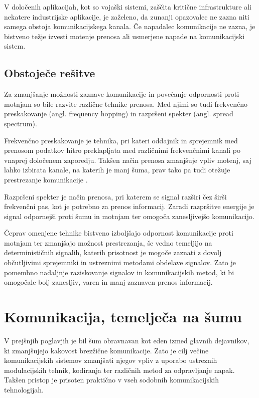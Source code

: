 \documentclass[a4paper, 12pt, openany]{book}
\begin{document}
V določenih aplikacijah, kot so vojaški sistemi, zaščita kritične infrastrukture ali nekatere industrijske aplikacije, je zaželeno, da zunanji opazovalec ne zazna niti samega obstoja komunikacijskega kanala. Če napadalec komunikacije ne zazna, je bistveno težje izvesti motenje prenosa ali usmerjene napade na komunikacijski sistem.

\subsection{Obstoječe rešitve}
Za zmanjšanje možnosti zaznave komunikacije in povečanje odpornosti proti motnjam so bile razvite različne tehnike prenosa. Med njimi so tudi frekvenčno preskakovanje (angl. frequency hopping) in razpršeni spekter (angl. spread spectrum).

Frekvenčno preskakovanje je tehnika, pri kateri oddajnik in sprejemnik med prenosom podatkov hitro preklapljata med različnimi frekvenčnimi kanali po vnaprej določenem zaporedju. Takšen način prenosa zmanjšuje vpliv motenj, saj lahko izbirata kanale, na katerih je manj šuma, prav tako pa tudi otežuje prestrezanje komunikacije \cite{bluetoothAFH}.

Razpršeni spekter je način prenosa, pri katerem se signal razširi čez širši frekvenčni pas, kot je potrebno za prenos informacij. Zaradi razpršitve energije je signal odpornejši proti šumu in motnjam ter omogoča zanesljivejšo komunikacijo.


Čeprav omenjene tehnike bistveno izboljšajo odpornost komunikacije proti motnjam ter zmanjšajo možnost prestrezanja, še vedno temeljijo na determinističnih signalih, katerih prisotnost je mogoče zaznati z dovolj občutljivimi sprejemniki in ustreznimi metodami obdelave signalov. Zato je pomembno nadaljnje raziskovanje signalov in komunikacijskih metod, ki bi omogočale bolj zanesljiv, varen in manj zaznaven prenos informacij.

\section{Komunikacija, temelječa na šumu}

V prejšnjih poglavjih je bil šum obravnavan kot eden izmed glavnih dejavnikov, ki zmanjšujejo kakovost brezžične komunikacije. Zato je cilj večine komunikacijskih sistemov zmanjšati njegov vpliv z uporabo ustreznih modulacijskih tehnik, kodiranja ter različnih metod za odpravljanje napak. Takšen pristop je prisoten praktično v vseh sodobnih komunikacijskih tehnologijah.
\end{document}
